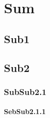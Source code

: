 

\chapter{Sum}

\label{Label for title 5}

\section{Sub1}
\section{Sub2}
\subsection{SubSub2.1}
\subsubsection{SebSub2.1.1}